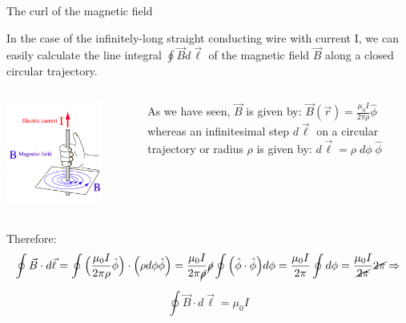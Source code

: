 \begin{frame}{The curl of the magnetic field}

In the case of the infinitely-long straight conducting wire with current I,
we can easily calculate the line integral $\oint \vec{B}  d\vec{\ell}$  of the magnetic field
$\vec{B}$ along a closed circular trajectory.\\
\vspace{0.1cm}

\begin{columns}
  \begin{column}{0.30\textwidth}
    \includegraphics[width=0.77\textwidth]{./images/schematics/magnetic_field_around_wire_01.png}
  \end{column}
  \begin{column}{0.70\textwidth}
      As we have seen, $\vec{B}$ is given by:
      $\vec{B}(\vec{r}) = \frac{\mu_0I}{2\pi \rho} \hat{\phi}$
      whereas an infinitesimal step $d\vec{\ell}$ on a circular trajectory or radius $\rho$ is given by:
      $d\vec{\ell} = \rho \; d\phi \; \hat{\phi}$
  \end{column}
\end{columns}

\vspace{0.2cm}

Therefore:
\begin{equation*}
   \oint \vec{B} \cdot d\vec{\ell} =
      \oint \Big(  \frac{\mu_0I}{2\pi \rho} \hat{\phi} \Big) \cdot \Big( \rho d\phi \hat{\phi} \Big) =
      \frac{\mu_0I}{2\pi \cancel{\rho}} \cancel{\rho}  \oint \Big( \hat{\phi} \cdot \hat{\phi} \Big) d\phi =
      \frac{\mu_0I}{2\pi} \oint d\phi =
      \frac{\mu_0I}{\cancel{2\pi}} \cancel{2\pi} \Rightarrow
\end{equation*}

\begin{equation*}
   \oint \vec{B} \cdot d\vec{\ell} = \mu_0 I
\end{equation*}

\end{frame}

